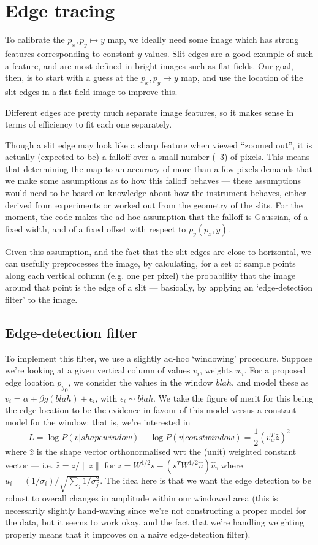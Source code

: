 \section{Edge tracing}
\label{sec:edgeTracing}

To calibrate the $p_x, p_y \mapsto y$ map, we ideally need some image
which has strong features corresponding to constant $y$ values. Slit
edges are a good example of such a feature, and are most defined in
bright images such as flat fields. Our goal, then, is to start with a
guess at the $p_x, p_y \mapsto y$ map, and use the location of the slit
edges in a flat field image to improve this.

Different edges are pretty much separate image features, so it makes
sense in terms of efficiency to fit each one separately.

Though a slit edge may look like a sharp feature when viewed ``zoomed
out'', it is actually (expected to be) a falloff over a small number
(~3) of pixels. This means that determining the map to an accuracy
of more than a few pixels demands that we make some assumptions as
to how this falloff behaves --- these assumptions would need to be
based on knowledge about how the instrument behaves, either derived
from experiments or worked out from the geometry of the slits. For
the moment, the code makes the ad-hoc assumption that the falloff is
Gaussian, of a fixed width, and of a fixed offset with respect to
$p_y(p_x, y)$.

Given this assumption, and the fact that the slit edges are close to
horizontal, we can usefully preprocesses the image, by calculating,
for a set of sample points along each vertical column (e.g. one per pixel)
the probability that the image around that point is the edge of a slit
--- basically, by applying an `edge-detection filter' to the image.

\subsection{Edge-detection filter}

To implement this filter, we use a slightly ad-hoc `windowing' procedure.
Suppose we're looking at a given vertical column of values $v_i$, weights
$w_i$. For a proposed edge location ${p_y}_0$, we consider the values
in the window $blah$, and model these as $v_i = \alpha + \beta g(blah) + \epsilon_i$,
with $\epsilon_i \sim blah$. We take the figure of merit for this being
the edge location to be the evidence in favour of this model versus a constant
model for the window: that is, we're interested in
\[
L = \log P(v|shape window) - \log P(v|const window) = \frac{1}{2} (v_w^T \hat z)^2
\]
where $\hat z$ is the shape vector orthonormalised wrt the (unit)
weighted constant vector --- i.e. $\hat z = z / \| z \|$ for $z =
W^{1/2} s - (s^T W^{1/2} \hat u) \hat u$, where $\hat u_i = (1/\sigma_i)
/ \sqrt{\sum_j 1/\sigma_j^2}$. The idea here is that we want the edge
detection to be robust to overall changes in amplitude within our
windowed area (this is necessarily slightly hand-waving since we're not
constructing a proper model for the data, but it seems to work okay, and
the fact that we're handling weighting properly means that it improves
on a naive edge-detection filter).

